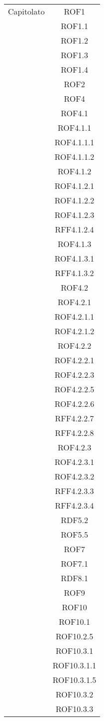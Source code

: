 \begin{longtable}{|c|c|}
\midrule
Capitolato
& ROF1\\
& ROF1.1\\
& ROF1.2\\
& ROF1.3\\
& ROF1.4\\
& ROF2\\
& ROF4\\
& ROF4.1\\
& ROF4.1.1\\
& ROF4.1.1.1\\
& ROF4.1.1.2\\
& ROF4.1.2\\
& ROF4.1.2.1\\
& ROF4.1.2.2\\
& ROF4.1.2.3\\
& RFF4.1.2.4\\
& ROF4.1.3\\
& ROF4.1.3.1\\
& RFF4.1.3.2\\
& ROF4.2\\
& ROF4.2.1\\
& ROF4.2.1.1\\
& ROF4.2.1.2\\
& ROF4.2.2\\
& ROF4.2.2.1\\
& ROF4.2.2.3\\
& ROF4.2.2.5\\
& ROF4.2.2.6\\
& RFF4.2.2.7\\
& RFF4.2.2.8\\
& ROF4.2.3\\
& ROF4.2.3.1\\
& ROF4.2.3.2\\
& RFF4.2.3.3\\
& RFF4.2.3.4\\
& RDF5.2\\
& ROF5.5\\
& ROF7\\
& ROF7.1\\
& RDF8.1\\
& ROF9\\
& ROF10\\
& ROF10.1\\
& ROF10.2.5\\
& ROF10.3.1\\
& ROF10.3.1.1\\
& ROF10.3.1.5\\
& ROF10.3.2\\
& ROF10.3.3\\

\end{longtable}
